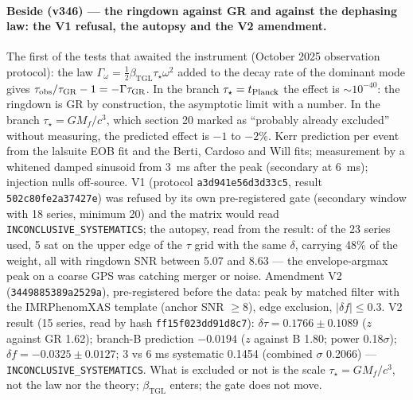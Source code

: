 \documentclass[11pt]{article}
\newcommand{\bTGL}{\beta_{\mathrm{TGL}}}\newcommand{\Msun}{M_{\odot}}\newcommand{\TGL}{\mathrm{TGL}}
\theoremstyle{definition}\newtheorem{deriv}{Derivation}
\begin{document}
\paragraph*{Beside (v346) --- the ringdown against GR and against the dephasing law: the V1 refusal, the autopsy and the V2 amendment.} The first of the tests that awaited the instrument (October 2025 observation protocol): the law $\Gamma_\omega=\tfrac12\bTGL\tau_\star\omega^2$ added to the decay rate of the dominant mode gives $\tau_{\rm obs}/\tau_{\rm GR}-1=-\Gamma\tau_{\rm GR}$. In the branch $\tau_\star=t_{\rm Planck}$ the effect is $\sim10^{-40}$: the ringdown is GR by construction, the asymptotic limit with a number. In the branch $\tau_\star=GM_f/c^3$, which section 20 marked as ``probably already excluded'' without measuring, the predicted effect is $-1$ to $-2\%$. Kerr prediction per event from the lalsuite EOB fit and the Berti, Cardoso and Will fits; measurement by a whitened damped sinusoid from $3$~ms after the peak (secondary at $6$~ms); injection nulls off-source. V1 (protocol \texttt{a3d941e56d3d33c5}, result \texttt{502c80fe2a37427e}) was refused by its own pre-registered gate (secondary window with 18 series, minimum 20) and the matrix would read \texttt{INCONCLUSIVE\_SYSTEMATICS}; the autopsy, read from the result: of the 23 series used, 5 sat on the upper edge of the $\tau$ grid with the same $\delta$, carrying 48\% of the weight, all with ringdown SNR between 5.07 and 8.63 --- the envelope-argmax peak on a coarse GPS was catching merger or noise. Amendment V2 (\texttt{3449885389a2529a}), pre-registered before the data: peak by matched filter with the IMRPhenomXAS template (anchor SNR $\ge8$), edge exclusion, $|\delta f|\le0.3$. V2 result (15 series, read by hash \texttt{ff15f023dd91d8c7}): $\delta\tau=0.1766\pm0.1089$ ($z$ against GR 1.62); branch-B prediction $-0.0194$ ($z$ against B 1.80; power 0.18$\sigma$); $\delta f=-0.0325\pm0.0127$; 3 vs 6 ms systematic 0.1454 (combined $\sigma$ 0.2066) --- \texttt{INCONCLUSIVE\_SYSTEMATICS}. What is excluded or not is the scale $\tau_\star=GM_f/c^3$, not the law nor the theory; $\bTGL$ enters; the gate does not move.
\end{document}
